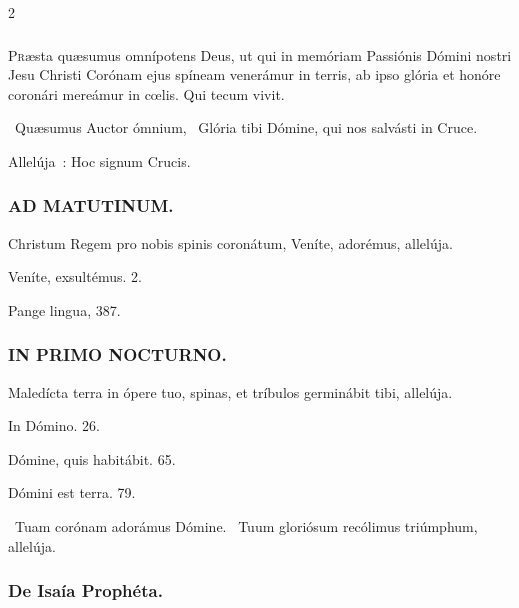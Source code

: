 \documentclass[9pt,twoside]{extarticle}
\begin{document}
\begin{multicols}{2}
{{\subsubsection*{\center {}}
\lettrine{P}ræsta quæsumus omnípotens Deus, ut qui in memóriam Passiónis Dómini nostri Jesu Christi Corónam ejus spíneam venerámur in terris, ab ipso glória et honóre coronári mereámur in cœlis. Qui tecum vivit.

\begin{tightlist}{}
\item {} ~Quæsumus Auctor ómnium,  ~Glória tibi Dómine, qui nos salvásti in Cruce.
\item {} Allelúja~: Hoc signum Crucis.
\end{tightlist}

\subsubsection*{\center \textsc{AD MATUTINUM.}}
\begin{tightlist}{}
\item {} Christum Regem pro nobis spinis coronátum, \textred{*} Veníte, adorémus, allelúja.
\item {} Veníte, exsultémus. 2.
\item {} Pange lingua,  387.
\end{tightlist}

\subsubsection*{\center \textsc{IN PRIMO NOCTURNO.}}
\begin{tightlist}{}
\item {} Maledícta terra in ópere tuo, spinas, et tríbulos germinábit tibi, allelúja.
\item {} In Dómino. 26. 
\item {} Dómine, quis habitábit. 65. 
\item {} Dómini est terra. 79. 
\item {}~Tuam corónam adorámus Dómine. ~Tuum gloriósum recólimus triúmphum, allelúja.
\end{tightlist}

\subsubsection*{\center De Isaía Prophéta.}
}}
\end{multicols}
\end{document}
